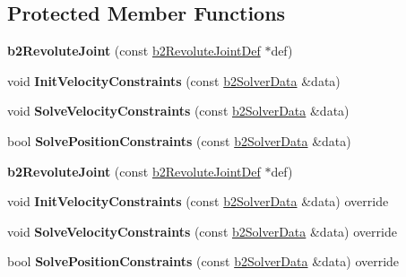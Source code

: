 \subsection*{Protected Member Functions}
\begin{DoxyCompactItemize}
\item 
\mbox{\label{classb2RevoluteJoint_a2571c1438e909fb3518de6f88bb29e01}} 
{\bfseries b2\+Revolute\+Joint} (const \hyperlink{structb2RevoluteJointDef}{b2\+Revolute\+Joint\+Def} $\ast$def)
\item 
\mbox{\label{classb2RevoluteJoint_af8f5a4b3fac025f0a0e5474b81667dfb}} 
void {\bfseries Init\+Velocity\+Constraints} (const \hyperlink{structb2SolverData}{b2\+Solver\+Data} \&data)
\item 
\mbox{\label{classb2RevoluteJoint_a9971ccf2570c9bf8c2e816aa5c0db05a}} 
void {\bfseries Solve\+Velocity\+Constraints} (const \hyperlink{structb2SolverData}{b2\+Solver\+Data} \&data)
\item 
\mbox{\label{classb2RevoluteJoint_ad07e86dedb1f42c7d78129a65c0184fc}} 
bool {\bfseries Solve\+Position\+Constraints} (const \hyperlink{structb2SolverData}{b2\+Solver\+Data} \&data)
\item 
\mbox{\label{classb2RevoluteJoint_a2571c1438e909fb3518de6f88bb29e01}} 
{\bfseries b2\+Revolute\+Joint} (const \hyperlink{structb2RevoluteJointDef}{b2\+Revolute\+Joint\+Def} $\ast$def)
\item 
\mbox{\label{classb2RevoluteJoint_a5ddddb865cc297c66721ae443bfb40a4}} 
void {\bfseries Init\+Velocity\+Constraints} (const \hyperlink{structb2SolverData}{b2\+Solver\+Data} \&data) override
\item 
\mbox{\label{classb2RevoluteJoint_a8eee8e87c79588ff041f1382b7fcbcd4}} 
void {\bfseries Solve\+Velocity\+Constraints} (const \hyperlink{structb2SolverData}{b2\+Solver\+Data} \&data) override
\item 
\mbox{\label{classb2RevoluteJoint_a01cab9d9609926a6debcd457bb8068f2}} 
bool {\bfseries Solve\+Position\+Constraints} (const \hyperlink{structb2SolverData}{b2\+Solver\+Data} \&data) override
\end{DoxyCompactItemize}
